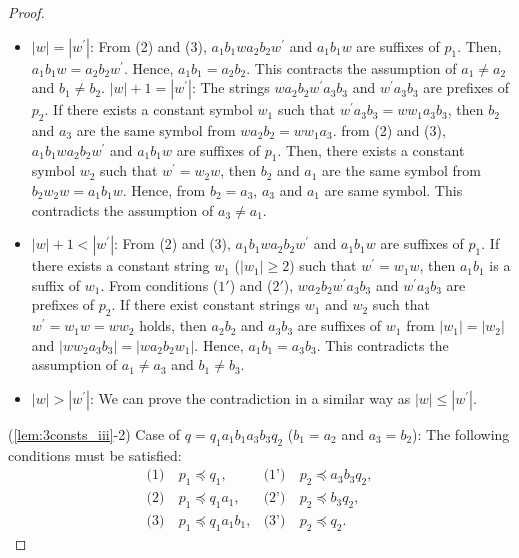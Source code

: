 \begin{proof}
\begin{itemize}
\item $|w|=|w^{\prime}|$: From (2) and (3), $a_{1}b_{1}wa_{2}b_{2}w^{\prime}$ and $a_{1}b_{1}w$ are suffixes of $p_{1}$.
Then, $a_{1}b_{1}w=a_{2}b_{2}w^{\prime}$.
Hence, $a_{1}b_{1}=a_{2}b_{2}$.
This contracts the assumption of $a_{1} \ne a_{2}$ and $b_{1} \ne b_{2}$.
%
$|w|+1=|w^{\prime}|$: The strings $wa_{2}b_{2}w^{\prime}a_{3}b_{3}$ and $w^{\prime}a_{3}b_{3}$ are prefixes of $p_{2}$.
If there exists a constant symbol $w_{1}$ such that $w^{\prime}a_{3}b_{3}=ww_{1}a_{3}b_{3}$,
then $b_{2}$ and $a_{3}$ are the same symbol from $wa_{2}b_{2}=ww_{1}a_{3}$.
from (2) and (3), $a_{1}b_{1}wa_{2}b_{2}w^{\prime}$ and $a_{1}b_{1}w$ are suffixes of $p_{1}$.
Then, there exists a constant symbol $w_{2}$ such that $w^{\prime}=w_{2}w$,
then $b_{2}$ and $a_{1}$ are the same symbol from $b_{2}w_{2}w=a_{1}b_{1}w$.
Hence, from $b_{2}=a_{3}$, $a_{3}$ and $a_{1}$ are same symbol.
This contradicts the assumption of $a_{3} \ne a_{1}$.
%
\item $|w|+1 < |w^{\prime}|$: From (2) and (3), 
$a_{1}b_{1}wa_{2}b_{2}w^{\prime}$ and $a_{1}b_{1}w$ are suffixes of $p_{1}$.
If there exists a constant string $w_{1}$ ($|w_{1}|\geq 2$) such that $w^{\prime}=w_{1}w$, then $a_{1}b_{1}$ is a suffix of $w_{1}$.
From  conditions ($1'$) and ($2'$), 
$wa_{2}b_{2}w^{\prime}a_{3}b_{3}$ and $w^{\prime}a_{3}b_{3}$ are prefixes of $p_{2}$.
If there exist constant strings $w_{1}$ and $w_{2}$ such that $w^{\prime} = w_{1}w=ww_{2}$ holds, then $a_{2}b_{2}$ and $a_{3}b_{3}$ are suffixes of $w_{1}$ from $|w_1|=|w_2|$ and $|ww_{2}a_{3}b_{3}|=|wa_{2}b_{2}w_{1}|$.
Hence, $a_{1}b_{1}=a_{3}b_{3}$.
This contradicts the assumption of $a_{1} \ne a_{3}$ and $b_{1} \ne b_{3}$.
%
\item $|w|>|w^{\prime}|$: We can prove the contradiction in a similar way as $|w|\le|w^{\prime}|$.
\end{itemize}

\smallskip

\noindent
(\ref{lem:3consts_iii}-2) Case of $q=q_{1}a_{1}b_{1}a_{3}b_{3}q_{2}$ ($b_{1}=a_{2}$ and $a_{3}=b_{2}$):
The following conditions must be satisfied:
\begin{align*}
\textrm{(1)}~& p_{1} \preceq q_{1}, & \textrm{(1')}~& p_{2} \preceq a_{3}b_{3}q_{2}, \\
\textrm{(2)}~& p_{1} \preceq q_{1}a_{1}, & \textrm{(2')}~& p_{2} \preceq b_{3}q_{2}, \\
\textrm{(3)}~& p_{1} \preceq q_{1}a_{1}b_{1}, & \textrm{(3')}~& p_{2} \preceq q_{2}.
\end{align*}


\end{proof}
